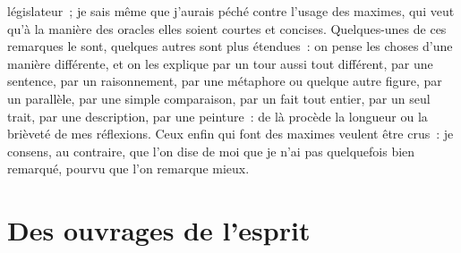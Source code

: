 \documentclass[french,twoside]{book} %
\newcommand\chapteropen{} %
\newcommand\chapterclose{} %
\begin{document}
législateur ; je sais même que j’aurais péché contre l’usage des maximes, qui veut qu’à la manière des oracles elles soient courtes et concises. Quelques-unes de ces remarques le sont, quelques autres sont plus étendues : on pense les choses d’une manière différente, et on les explique par un tour aussi tout différent, par une sentence, par un raisonnement, par une métaphore ou quelque autre figure, par un parallèle, par une simple comparaison, par un fait tout entier, par un seul trait, par une description, par une peinture : de là procède la longueur ou la brièveté de mes réflexions. Ceux enfin qui font des maximes veulent être crus : je consens, au contraire, que l’on dise de moi que je n’ai pas quelquefois bien remarqué, pourvu que l’on remarque mieux.
\chapterclose


\chapteropen
\chapter[{Des ouvrages de l’esprit}]{Des ouvrages de l’esprit}
\label{lb-oeuvres}\renewcommand{\leftmark}{Des ouvrages de l’esprit}
\end{document}
